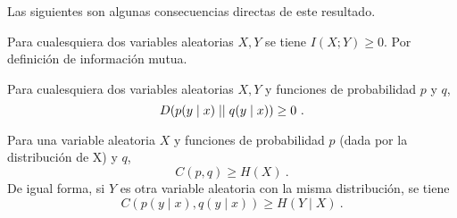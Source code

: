 \proofe
\theoe

Las siguientes son algunas consecuencias directas de este resultado.

Para cualesquiera dos variables aleatorias \(X, Y\) se tiene
\(I(X;Y)\geq 0\). \proofb
Por definición de información mutua. \proofe
\core

\corb
Para cualesquiera dos variables aleatorias \(X, Y\) y funciones de
probabilidad \(p\) y \(q\), \[D(p(y\mid x)\mid\mid q(y\mid x))\geq 0~.\]
\core

\corb
Para una variable aleatoria \(X\) y funciones de probabilidad \(p\)
(dada por la distribución de X) y \(q\), \[C(p, q)\geq H(X)~.\] De igual
forma, si \(Y\) es otra variable aleatoria con la misma distribución, se
tiene \[C(p(y\mid x), q(y\mid x))\geq H(Y\mid X)~.\] \core
